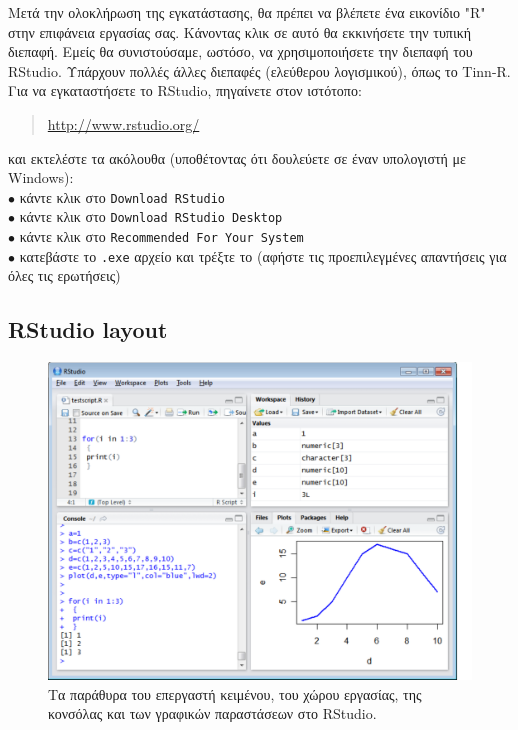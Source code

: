 \documentclass[a4paper,11pt,twocolumn,tablecaptionabove]{scrartcl}
\makeatletter
\let\SF@@footnote\footnote
\def\footnote{\ifx\protect\@typeset@protect
 \expandafter\SF@@footnote
 \else
 \expandafter\SF@gobble@opt
 \fi
}
\edef\SF@gobble@opt{\noexpand\protect
 \expandafter\noexpand\csname SF@gobble@opt \endcsname}
\makeatother
\begin{document}
Μετά την ολοκλήρωση της εγκατάστασης, θα πρέπει να βλέπετε ένα εικονίδιο "R" στην επιφάνεια
εργασίας σας. Κάνοντας κλικ σε αυτό θα εκκινήσετε την τυπική διεπαφή. Εμείς θα συνιστούσαμε,
ωστόσο, να χρησιμοποιήσετε την διεπαφή του RStudio. \footnote{Υπάρχουν πολλές άλλες διεπαφές
(ελεύθερου λογισμικού), όπως το Tinn-R.} Για να εγκαταστήσετε το RStudio, πηγαίνετε στον ιστότοπο: 
\begin{quote}
  \url{http://www.rstudio.org/}
\end{quote}
και εκτελέστε τα ακόλουθα (υποθέτοντας ότι δουλεύετε σε έναν υπολογιστή με Windows):\\
\noindent $\bullet$ κάντε κλικ στο \texttt{Download RStudio}\\
\noindent $\bullet$ κάντε κλικ στο \texttt{Download RStudio Desktop}\\
\noindent $\bullet$ κάντε κλικ στο \texttt{Recommended For Your System}\\
\noindent $\bullet$ κατεβάστε το \texttt{.exe} αρχείο και τρέξτε το 
(αφήστε τις προεπιλεγμένες απαντήσεις για όλες τις ερωτήσεις)

\subsection{RStudio layout}

\begin{figure}[htb]
  \centering
  \includegraphics[width=13cm, clip=true, trim=0cm 0cm 9mm 0cm]{img/rstudio_screenshot.pdf}
  \caption{Τα παράθυρα του επεργαστή κειμένου, του χώρου εργασίας, της κονσόλας και των γραφικών παραστάσεων στο RStudio.}
  \label{fig:screenshot}
\end{figure}
\end{document}
